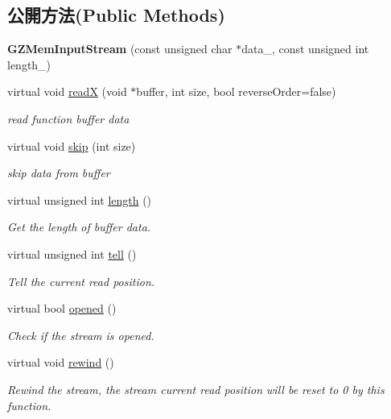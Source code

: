 \subsection*{公開方法(Public Methods)}
\begin{DoxyCompactItemize}
\item 
{\bfseries G\+Z\+Mem\+Input\+Stream} (const unsigned char $\ast$data\+\_\+, const unsigned int length\+\_\+)\hypertarget{class_magnum_1_1_g_z_mem_input_stream_a2a861910fa060eebbf0ac6faa7cc26f0}{}\label{class_magnum_1_1_g_z_mem_input_stream_a2a861910fa060eebbf0ac6faa7cc26f0}

\item 
virtual void \hyperlink{class_magnum_1_1_g_z_mem_input_stream_a8b564628112ee05eb92351f7eac1e355}{readX} (void $\ast$buffer, int size, bool reverse\+Order=false)
\begin{DoxyCompactList}\small\item\em read function buffer data \end{DoxyCompactList}\item 
virtual void \hyperlink{class_magnum_1_1_g_z_mem_input_stream_a61f5615cf4feac1867e3722b48cf44b0}{skip} (int size)
\begin{DoxyCompactList}\small\item\em skip data from buffer \end{DoxyCompactList}\item 
virtual unsigned int \hyperlink{class_magnum_1_1_g_z_mem_input_stream_a74c846aad4ffeb30d5c578cca1e1e5d1}{length} ()
\begin{DoxyCompactList}\small\item\em Get the length of buffer data. \end{DoxyCompactList}\item 
virtual unsigned int \hyperlink{class_magnum_1_1_g_z_mem_input_stream_abad8034612efd18ba47bb45231e42cc1}{tell} ()
\begin{DoxyCompactList}\small\item\em Tell the current read position. \end{DoxyCompactList}\item 
virtual bool \hyperlink{class_magnum_1_1_g_z_mem_input_stream_a8ae7c17e52f20ee24a0a13ce45816981}{opened} ()
\begin{DoxyCompactList}\small\item\em Check if the stream is opened. \end{DoxyCompactList}\item 
virtual void \hyperlink{class_magnum_1_1_g_z_mem_input_stream_af5d94c076844481fca4050ecd0f21c08}{rewind} ()
\begin{DoxyCompactList}\small\item\em Rewind the stream, the stream current read position will be reset to 0 by this function. \end{DoxyCompactList}\end{DoxyCompactItemize}

